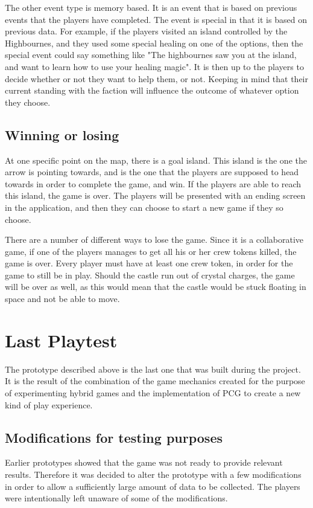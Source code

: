 The other event type is memory based. It is an event that is based on previous events that the players have completed. The event is special in that it is based on previous data. For example, if the players visited an island controlled by the Highbournes, and they used some special healing on one of the options, then the special event could say something like "The highbournes saw you at the island, and want to learn how to use your healing magic". It is then up to the players to decide whether or not they want to help them, or not. Keeping in mind that their current standing with the faction will influence the outcome of whatever option they choose. 

\subsection{Winning or losing}
At one specific point on the map, there is a goal island. This island is the one the arrow is pointing towards, and is the one that the players are supposed to head towards in order to complete the game, and win.
If the players are able to reach this island, the game is over. The players will be presented with an ending screen in the application, and then they can choose to start a new game if they so choose. 

There are a number of different ways to lose the game. Since it is a collaborative game, if one of the players manages to get all his or her crew tokens killed, the game is over. Every player must have at least one crew token, in order for the game to still be in play.
Should the castle run out of crystal charges, the game will be over as well, as this would mean that the castle would be stuck floating in space and not be able to move.

\section{Last Playtest}
The prototype described above is the last one that was built during the project. It is the result of the combination of the game mechanics created for the purpose of experimenting hybrid games and the implementation of PCG to create a new kind of play experience.
\subsection{Modifications for testing purposes}
Earlier prototypes showed that the game was not ready to provide relevant results. Therefore it was decided to alter the prototype with a few modifications in order to allow a sufficiently large amount of data to be collected. The players were intentionally left unaware of some of the modifications.

